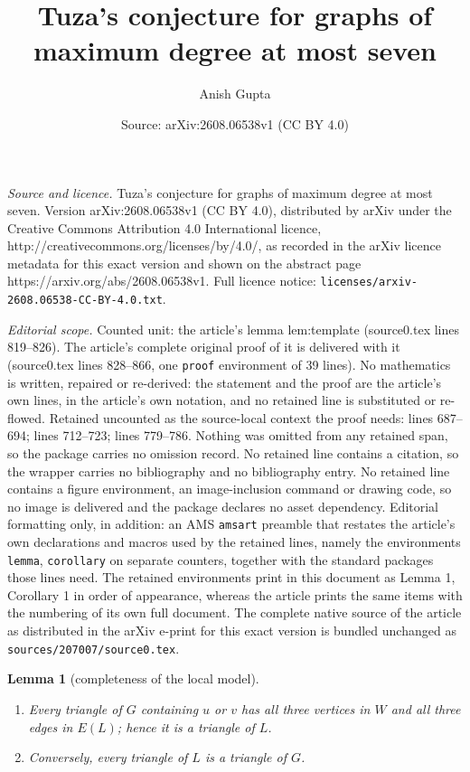 \documentclass[10pt,a4paper]{amsart}
\title{Tuza's conjecture for graphs of maximum degree at most seven}
\author{Anish Gupta}
\date{Source: arXiv:2608.06538v1 (CC BY 4.0)}
\newtheorem{lemma}{Lemma}
\begin{document}
\maketitle

\noindent\emph{Source and licence.} Tuza's conjecture for graphs of maximum degree at most seven. Version arXiv:2608.06538v1 (CC BY 4.0), distributed by arXiv under the Creative Commons Attribution 4.0 International licence, http://creativecommons.org/licenses/by/4.0/, as recorded in the arXiv licence metadata for this exact version and shown on the abstract page https://arxiv.org/abs/2608.06538v1. Full licence notice: \texttt{licenses/arxiv-2608.06538-CC-BY-4.0.txt}.\par\smallskip

\noindent\textit{Editorial scope.} Counted unit: the article's lemma lem:template (source0.tex lines 819--826). The article's complete original proof of it is delivered with it (source0.tex lines 828--866, one \texttt{proof} environment of 39 lines). No mathematics is written, repaired or re-derived: the statement and the proof are the article's own lines, in the article's own notation, and no retained line is substituted or re-flowed.  Retained uncounted as the source-local context the proof needs: lines 687--694; lines 712--723; lines 779--786.  Nothing was omitted from any retained span, so the package carries no omission record.  No retained line contains a citation, so the wrapper carries no bibliography and no bibliography entry.  No retained line contains a figure environment, an image-inclusion command or drawing code, so no image is delivered and the package declares no asset dependency.  Editorial formatting only, in addition: an AMS \texttt{amsart} preamble that restates the article's own declarations and macros used by the retained lines, namely the environments \texttt{lemma}, \texttt{corollary} on separate counters, together with the standard packages those lines need.  The retained environments print in this document as Lemma 1, Corollary 1 in order of appearance, whereas the article prints the same items with the numbering of its own full document.  The complete native source of the article as distributed in the arXiv e-print for this exact version is bundled unchanged as \texttt{sources/207007/source0.tex}.
\begin{lemma}[completeness of the local model]\label{lem:localcomplete}
\begin{enumerate}
  \item[(a)] Every triangle of $G$ containing $u$ or $v$ has all three
    vertices in $W$ and all three edges in $E(L)$; hence it is a triangle
    of $L$.
  \item[(b)] Conversely, every triangle of $L$ is a triangle of $G$.
\end{enumerate}
\end{lemma}
\end{document}
